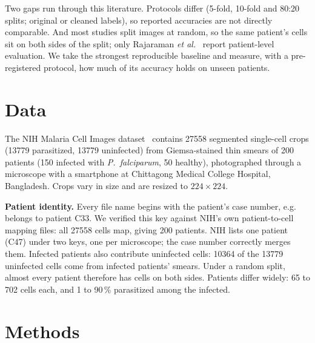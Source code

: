 \documentclass[conference]{IEEEtran}
\begin{document}
Two gaps run through this literature. Protocols differ (5-fold, 10-fold and 80:20 splits; original or cleaned labels), so reported accuracies are not directly comparable. And most studies split images at random, so the same patient's cells sit on both sides of the split; only Rajaraman \emph{et al.}~\cite{rajaraman2018,rajaraman2019} report patient-level evaluation. We take the strongest reproducible baseline and measure, with a pre-registered protocol, how much of its accuracy holds on unseen patients.

\section{Data}
The NIH Malaria Cell Images dataset~\cite{rajaraman2018} contains \num{27558} segmented single-cell crops (\num{13779} parasitized, \num{13779} uninfected) from Giemsa-stained thin smears of 200 patients (150 infected with \emph{P.~falciparum}, 50 healthy), photographed through a microscope with a smartphone at Chittagong Medical College Hospital, Bangladesh. Crops vary in size and are resized to $224\times224$.

\textbf{Patient identity.} Every file name begins with the patient's case number, e.g.\  belongs to patient C33. We verified this key against NIH's own patient-to-cell mapping files: all \num{27558} cells map, giving 200 patients. NIH lists one patient (C47) under two keys, one per microscope; the case number correctly merges them. Infected patients also contribute uninfected cells: \num{10364} of the \num{13779} uninfected cells come from infected patients' smears. Under a random split, almost every patient therefore has cells on both sides. Patients differ widely: 65 to 702 cells each, and 1 to 90\,\% parasitized among the infected.

\section{Methods}
\end{document}
